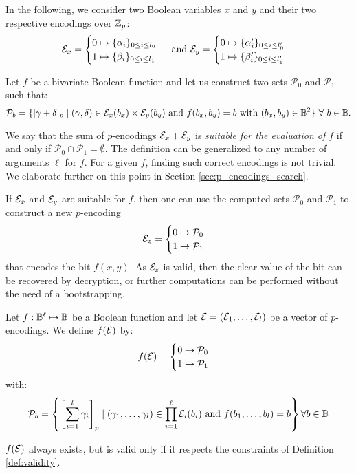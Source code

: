 In the following, we consider two Boolean variables $x$ and $y$ and their two respective encodings over $\mathbb{Z}_p$: 
\begin{equation}
\mathcal{E}_x = 
\begin{cases} 0 \mapsto \{\alpha_i\}_{0 \le i \le l_0} \\ 1 \mapsto \{\beta_i\}_{0 \le i \le l_1} \end{cases} \text{ and } \mathcal{E}_y = \begin{cases} 0 \mapsto \{\alpha'_i\}_{0 \le i \le l'_0} \\ 1 \mapsto \{\beta'_i\}_{0 \le i \le l'_1} \end{cases}
\label{eq:encoding_definition}
\end{equation}


Let $f$ be a bivariate Boolean function and let us construct two sets $\mathcal{P}_0$ and $\mathcal{P}_1$ such that:
\begin{equation}
    \mathcal{P}_b = \{[\gamma + \delta]_p \mid (\gamma, \delta) \in \mathcal{E}_x(b_x) \times \mathcal{E}_y(b_y) \text{ and } f(b_x, b_y) = b \text{ with } (b_x, b_y) \in \mathbb{B}^2\}~\forall~b \in \mathbb{B}.
    \label{def:sets_p}
\end{equation}

We say that the sum of $p$-encodings $\mathcal{E}_x + \mathcal{E}_y$ is \emph{suitable for the evaluation of $f$} if and only if $\mathcal{P}_0 \cap \mathcal{P}_1 = \emptyset$. The definition can be generalized to any number of arguments $\ell$ for $f$. For a given $f$, finding such correct encodings is not trivial. We elaborate further on this point in Section \ref{sec:p_encodings_search}. 

If $\mathcal{E}_x$ and $\mathcal{E}_y$ are suitable for $f$, then one can use the computed sets $\mathcal{P}_0$ and $\mathcal{P}_1$ to construct a new $p$-encoding \[\mathcal{E}_z = \begin{cases} 0 \mapsto \mathcal{P}_0 \\ 1 \mapsto \mathcal{P}_1 \end{cases}\] that encodes the bit $f(x, y)$. As $\mathcal{E}_z$ is valid, then the clear value of the bit can be recovered by decryption, or further computations can be performed without the need of a bootstrapping. 


\begin{definition}
    Let $f:\mathbb{B}^\ell \mapsto \mathbb{B}$ be a Boolean function and let $\mathbf {\mathcal{E}} = (\mathcal{E}_1, \dots, \mathcal{E}_l)$ be a vector of $p$-encodings. We define $f(\mathbf {\mathcal{E}})$ by:
    \[f(\mathbf {\mathcal{E}}) = \begin{cases} 0 \mapsto \mathcal{P}_0 \\ 1 \mapsto \mathcal{P}_1 \end{cases}\]
    with: 
    \[\mathcal{P}_b = \left \{ \left [ \sum_{i=1}^{l} \gamma_i \right ]_p \mid (\gamma_1, \dots, \gamma_l) \in \prod_{i=1}^\ell \mathcal{E}_i(b_i) \text{ and } f(b_1, \dots, b_l) = b \right \} \forall b \in \mathbb{B}\]

$f(\mathbf {\mathcal{E}})$ always exists, but is valid only if it respects the constraints of Definition \ref{def:validity}.
\end{definition}



